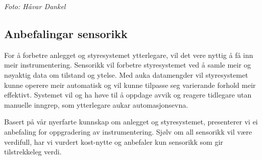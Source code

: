 \begin{center}
    \textit{Foto: Håvar Dankel}
\end{center}

\newpage

\subsection{Anbefalingar sensorikk}

For å forbetre anlegget og styresystemet ytterlegare, vil det vere nyttig å få inn meir instrumentering. 
Sensorikk vil forbetre styresystemet ved å samle meir og nøyaktig data om tilstand og ytelse. 
Med auka datamengder vil styresystemet kunne operere meir automatisk og vil kunne tilpasse seg varierande forhold meir effektivt. 
Systemet vil og ha høve til å oppdage avvik og reagere tidlegare utan manuelle inngrep, som ytterlegare aukar automasjonsevna.

Basert på vår nyerfarte kunnskap om anlegget og styresystemet, presenterer vi ei
anbefaling for oppgradering av instrumentering. 
Sjølv om all sensorikk vil være verdifull, har vi vurdert kost-nytte og anbefaler kun sensorikk som gir tilstrekkeleg verdi.


